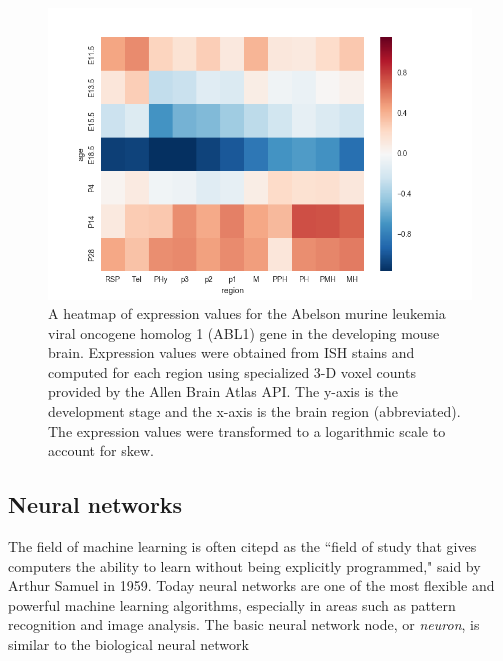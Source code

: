 \documentclass[12pt,oneside,onecolumn,a4paper]{article}
\begin{document}
\begin{figure}[h!]
\begin{center}
\includegraphics[width=0.7\columnwidth]{figures/Abl1/Abl1}
\caption{A heatmap of expression values for the Abelson murine leukemia viral oncogene homolog 1 (ABL1) gene in the developing mouse brain. Expression values were obtained from ISH stains and computed for each region using specialized 3-D voxel counts provided by the Allen Brain Atlas API. The y-axis is the development stage and the x-axis is the brain region (abbreviated). The expression values were transformed to a logarithmic scale to account for skew.%
}
\end{center}
\end{figure}

\subsection{Neural networks}
The field of machine learning is often citepd as the ``field of study that gives computers the ability to learn without being
explicitly programmed," said by Arthur Samuel in 1959. Today neural networks are one of the most flexible and powerful machine learning algorithms, especially in areas such as pattern recognition and image analysis. The basic neural network node, or \textit{neuron}, is similar to the biological neural network
\end{document}

